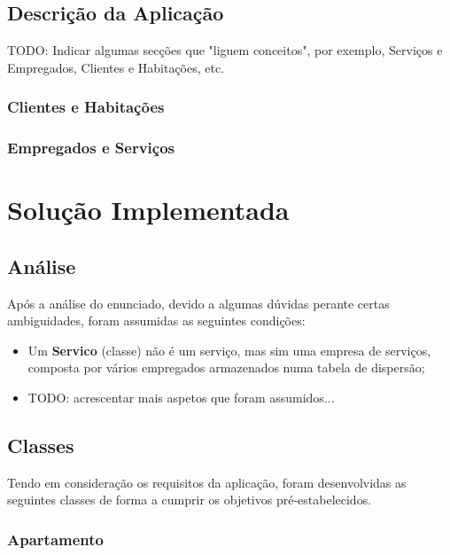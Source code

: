 \documentclass[a4paper]{article}
\begin{document}
\subsection{Descrição da Aplicação}

TODO: Indicar algumas secções que "liguem conceitos", por exemplo, Serviços e Empregados, Clientes e Habitações, etc.

\subsubsection{Clientes e Habitações}

\subsubsection{Empregados e Serviços}

\newpage

\section{Solução Implementada}

\subsection{Análise}

Após a análise do enunciado, devido a algumas dúvidas perante certas ambiguidades, foram assumidas as seguintes condições:

\begin{itemize}

	\item Um \textbf{Servico} (classe) não é um serviço, mas sim uma empresa de serviços, composta por vários empregados armazenados numa tabela de dispersão;
	\item TODO: acrescentar mais aspetos que foram assumidos...

\end{itemize}

\subsection{Classes}

Tendo em consideração os requisitos da aplicação, foram desenvolvidas as seguintes classes de forma a cumprir os objetivos pré-estabelecidos.

\subsubsection{Apartamento}
\end{document}
